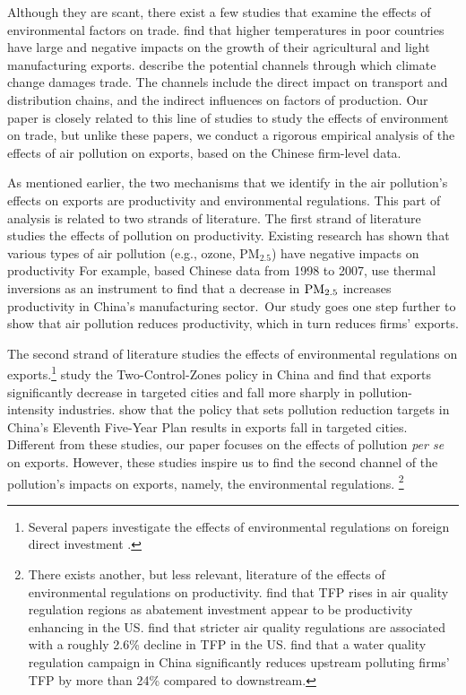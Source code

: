 \documentclass[12pt]{article}
\begin{document}
Although they are scant, there exist a few studies that examine the effects
of environmental factors on trade. \cite{jones2010climate} find that higher
temperatures in poor countries have large and negative impacts on the growth
of their agricultural and light manufacturing exports. \cite%
{dellink2017international} describe the potential channels through which
climate change damages trade. The channels include the direct impact on
transport and distribution chains, and the indirect influences on factors of
production. Our paper is closely related to this line of studies to study
the effects of environment on trade, but unlike these papers, we conduct a
rigorous empirical analysis of the effects of air pollution on exports,
based on the Chinese firm-level data.

As mentioned earlier, the two mechanisms that we identify in the air
pollution's effects on exports are productivity and environmental
regulations. This part of analysis is related to two strands of literature.
The first strand of literature studies the effects of pollution on productivity.
Existing research has shown that various types of air pollution (e.g.,
ozone, $\mathrm{PM_{2.5}}$) have negative impacts on productivity %
\citep{graff2012impact,chang2016particulate,fu2021air,adhvaryu2022management}
For example, based Chinese data from 1998 to 2007, \cite{fu2021air} use
thermal inversions as an instrument to find that a decrease in $\mathrm{%
PM_{2.5}}$ increases productivity in China's manufacturing sector.\ Our
study goes one step further to show that air pollution reduces productivity,
which in turn reduces firms' exports.

The second strand of literature studies the effects of environmental regulations on
exports.\footnote{%
Several papers investigate the effects of environmental regulations on
foreign direct investment \citep{dean2009foreign,cai2016does}.} \cite%
{hering2014environmental} study the Two-Control-Zones policy in China and
find that exports significantly decrease in targeted cities and fall more
sharply in pollution-intensity industries. \cite{shi2018environmental} show
that the policy that sets pollution reduction targets in China's Eleventh
Five-Year Plan results in exports fall in targeted cities. Different from
these studies, our paper focuses on the effects of pollution \textit{per se}
on exports. However, these studies inspire us to find the second channel of
the pollution's impacts on exports, namely, the environmental regulations.%
\footnote{%
There exists another, but less relevant, literature of the effects of
environmental regulations on productivity. \cite{berman2001environmental}
find that TFP rises in air quality regulation regions as abatement
investment appear to be productivity enhancing in the US. \cite{NBERw18392}
find that stricter air quality regulations are associated with a roughly
2.6\% decline in TFP in the US. \cite{he2020watering} find that a water
quality regulation campaign in China significantly reduces upstream
polluting firms' TFP by more than 24\% compared to downstream.}
\end{document}
